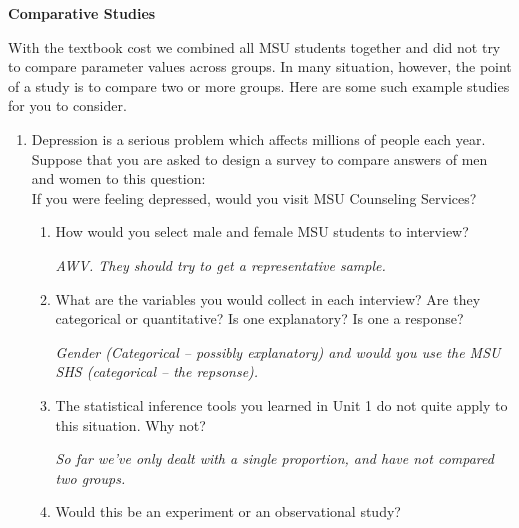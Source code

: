 \def\theTopic{Reading 10}

\begin{center}
  {\large\bf Comparative Studies}
\end{center}

  With the textbook cost we combined all MSU students together and did
  not try to compare parameter values across groups.  In many
  situation, however, the point of a study is to compare two or more
  groups. Here are some such example studies for you to consider. 

\begin{enumerate}
  \item  Depression is a serious problem which affects millions of
    people each year. Suppose that you are asked to 
    design a survey to compare answers of men and women to this question:\\
    {\sf If you were feeling depressed, would you visit MSU Counseling Services?}
    \begin{enumerate}
    \item How would you select male and female MSU students to
      interview?
\begin{students}
        \vfill
\end{students}
\begin{key}
 {\it AWV. They should try to get a representative sample.}
\end{key}
\item What are the variables you would collect in each interview?
      Are they categorical or quantitative? Is one explanatory? Is one a response?
\begin{students}
        \vfill
\end{students}
\begin{key}
 {\it Gender (Categorical -- possibly explanatory) and would you use
   the MSU SHS (categorical -- the repsonse).}
\end{key}
    \item The statistical inference tools you learned in Unit 1 do not
      quite apply to this situation.  Why not? 
\begin{students}
        \vfill
\end{students}
\begin{key}
 {\it So far we've only dealt with a single proportion, and have not
   compared two groups. }
\end{key}
    \item Would this be an experiment or an observational study?
\begin{students}

\end{students}
\end{enumerate}
\end{enumerate}

